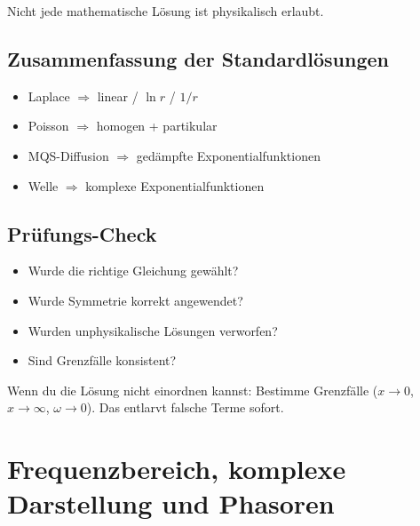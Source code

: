 \documentclass[a4paper]{article}
\begin{document}
\begin{merke}
Nicht jede mathematische Lösung ist physikalisch erlaubt.
\end{merke}

\subsection{Zusammenfassung der Standardlösungen}

\begin{schema}
\begin{itemize}
  \item Laplace $\Rightarrow$ linear / $\ln r$ / $1/r$
  \item Poisson $\Rightarrow$ homogen + partikular
  \item MQS-Diffusion $\Rightarrow$ gedämpfte Exponentialfunktionen
  \item Welle $\Rightarrow$ komplexe Exponentialfunktionen
\end{itemize}
\end{schema}

\subsection{Prüfungs-Check}

\begin{checkitem}
\begin{itemize}
  \item Wurde die richtige Gleichung gewählt?
  \item Wurde Symmetrie korrekt angewendet?
  \item Wurden unphysikalische Lösungen verworfen?
  \item Sind Grenzfälle konsistent?
\end{itemize}
\end{checkitem}

\begin{taktik}
Wenn du die Lösung nicht einordnen kannst:
Bestimme Grenzfälle ($x\to 0$, $x\to\infty$, $\omega\to 0$).
Das entlarvt falsche Terme sofort.
\end{taktik}
\section{Frequenzbereich, komplexe Darstellung und Phasoren}
\end{document}
